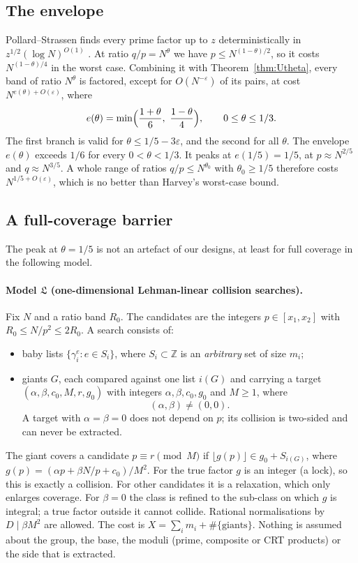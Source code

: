 \documentclass[11pt]{amsart}
\theoremstyle{definition}
\newcommand{\Z}{\mathbb{Z}}
\begin{document}
\subsection{The envelope}
Pollard--Strassen finds every prime factor up to $z$ deterministically in
$z^{1/2}(\log N)^{O(1)}$ \cite{pollard1974,strassen1976,bgs2007}. At ratio $q/p=N^\theta$ we have
$p\le N^{(1-\theta)/2}$, so it costs $N^{(1-\theta)/4}$ in the worst case. Combining it with
Theorem~\ref{thm:Utheta}, every band of ratio $N^\theta$ is factored, except for $O(N^{-\varepsilon})$
of its pairs, at cost $N^{e(\theta)+O(\varepsilon)}$, where
\[
  e(\theta)=\min\Bigl(\frac{1+\theta}6,\ \frac{1-\theta}4\Bigr),\qquad0\le\theta\le1/3.
\]
The first branch is valid for $\theta\le1/5-3\varepsilon$, and the second for all $\theta$. The
envelope $e(\theta)$ exceeds $1/6$ for every $0<\theta<1/3$. It peaks at $e(1/5)=1/5$, at
$p\approx N^{2/5}$ and $q\approx N^{3/5}$. A whole range of ratios $q/p\le N^{\theta_0}$ with
$\theta_0\ge1/5$ therefore costs $N^{1/5+O(\varepsilon)}$, which is no better than Harvey's
worst-case bound.

\subsection{A full-coverage barrier}
The peak at $\theta=1/5$ is not an artefact of our designs, at least for full coverage in the
following model.

\paragraph{Model $\mathfrak L$ (one-dimensional Lehman-linear collision searches).}
Fix $N$ and a ratio band $R_0$. The candidates are the integers $p\in[x_1,x_2]$ with
$R_0\le N/p^2\le2R_0$. A search consists of:
\begin{itemize}
\item baby lists $\{\gamma_i^e:e\in S_i\}$, where $S_i\subset\Z$ is an \emph{arbitrary} set of
  size $m_i$;
\item giants $G$, each compared against one list $i(G)$ and carrying a target
  $(\alpha,\beta,c_0,M,r,g_0)$ with integers $\alpha,\beta,c_0,g_0$ and $M\ge1$, where
  \[
  (\alpha,\beta)\ne(0,0).
  \]
  A target with $\alpha=\beta=0$ does not depend on $p$; its collision is two-sided and can never
  be extracted.
\end{itemize}
The giant covers a candidate $p\equiv r\pmod M$ if
$\lfloor g(p)\rfloor\in g_0+S_{i(G)}$, where $g(p)=(\alpha p+\beta N/p+c_0)/M^2$. For the true
factor $g$ is an integer (a lock), so this is exactly a collision. For other candidates it is a
relaxation, which only enlarges coverage. For $\beta=0$ the class is refined to the sub-class on
which $g$ is integral; a true factor outside it cannot collide. Rational normalisations by $D\mid\beta M^2$ are allowed.
The cost is $X=\sum_im_i+\#\{\text{giants}\}$. Nothing is assumed about the group, the base, the
moduli (prime, composite or CRT products) or the side that is extracted.
\end{document}

